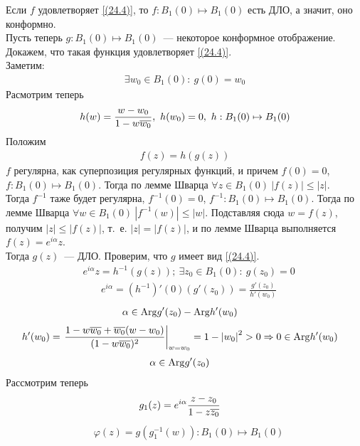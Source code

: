\pr
Если $f$ удовлетворяет \eqref{(24.4)}, то $f: B_1(0) \mapsto B_1(0)$ есть ДЛО, а
значит, оно конформно.
\\
Пусть теперь $g: B_1(0) \mapsto B_1(0)$~--- некоторое конформное отображение.
Докажем, что такая функция удовлетворяет \eqref{(24.4)}.
\\
Заметим:
\begin{align*}
  \exists w_0 \in B_1(0): \ g(0) = w_0
\end{align*}
Расмотрим теперь
\begin{align*}
  h(w) = \frac{w-w_0}{1-w\overline{w_0}}, \ h(w_0) = 0, \ h:B_1(0)\mapsto B_1(0)
\end{align*}
Положим
\begin{align*}
  f(z) = h(g(z))
\end{align*}
$f$ регулярна, как суперпозиция регулярных функций, и причем $f(0) = 0$,
$f:B_1(0) \mapsto B_1(0)$. Тогда по лемме Шварца $\forall z \in B_1(0) \ \left|
    f(z) \right|\leq \left| z \right|$.
\\
Тогда $f^{-1}$ таже будет регулярна, $f^{-1}(0) = 0$, $f^{-1}: B_1(0) \mapsto
B_1(0)$. Тогда по лемме Шварца $\forall w \in B_1(0) \ \left| f^{-1}(w)
\right|\leq \left| w \right|$. Подставляя сюда $w = f(z)$, получим $\left| z
\right| \leq \left| f(z) \right|$, т.~е. $\left| z \right| = \left| f(z)
\right|$, и по лемме Шварца выполняется $f(z) = e^{i\alpha}z$.
\\
Тогда $g(z)$~--- ДЛО. Проверим, что $g$ имеет вид \eqref{(24.4)}.
\begin{align*}
& e^{i\alpha}z = h^{-1}(g(z)); \ \exists z_0 \in B_1(0): \ g(z_0) = 0
\end{align*}
\begin{align*}
& e^{i\alpha} = (h^{-1})'(0)(g'(z_0)) = \frac{g'(z_0)}{h'(w_0)}
\end{align*}
\begin{align*}
& \alpha \in \mathrm{Arg} g'(z_0) - \mathrm{Arg} h'(w_0)
\end{align*}
\begin{align*}
& h'(w_0) = \left.\frac{1-w\overline{w_0}+\overline{w_0}(w-w_0)}{(1-w\overline{w_0})^2}\right|_{w=w_0} = 1 - \left| w_0 \right|^2 > 0 \Rightarrow 0 \in \mathrm{Arg} h'(w_0)
\end{align*}
\begin{align*}
& \alpha \in \mathrm{Arg} g'(z_0)
\end{align*}
Рассмотрим теперь 
\begin{align*}
& g_1(z) = e^{i\alpha}\frac{z-z_0}{1-z\overline{z_0}}
\end{align*}
\begin{align*}
&\varphi(z) = g(g_1^{-1}(w)): B_1(0) \mapsto B_1(0)
\end{align*}
